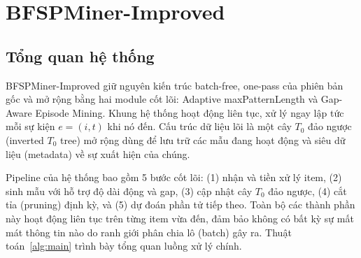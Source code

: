\documentclass{article}
\begin{document}
\section{BFSPMiner-Improved}
\label{sec:proposed}

\subsection{Tổng quan hệ thống}
BFSPMiner-Improved giữ nguyên kiến trúc batch-free, one-pass của phiên bản gốc và mở rộng bằng hai module cốt lõi: Adaptive maxPatternLength và Gap-Aware Episode Mining. Khung hệ thống hoạt động liên tục, xử lý ngay lập tức mỗi sự kiện $e = (i, t)$ khi nó đến. Cấu trúc dữ liệu lõi là một cây $T_0$ đảo ngược (inverted $T_0$ tree) mở rộng dùng để lưu trữ các mẫu đang hoạt động và siêu dữ liệu (metadata) về sự xuất hiện của chúng. 

Pipeline của hệ thống bao gồm 5 bước cốt lõi: (1) nhận và tiền xử lý item, (2) sinh mẫu với hỗ trợ độ dài động và gap, (3) cập nhật cây $T_0$ đảo ngược, (4) cắt tỉa (pruning) định kỳ, và (5) dự đoán phần tử tiếp theo. Toàn bộ các thành phần này hoạt động liên tục trên từng item vừa đến, đảm bảo không có bất kỳ sự mất mát thông tin nào do ranh giới phân chia lô (batch) gây ra. Thuật toán~\ref{alg:main} trình bày tổng quan luồng xử lý chính.
\end{document}
